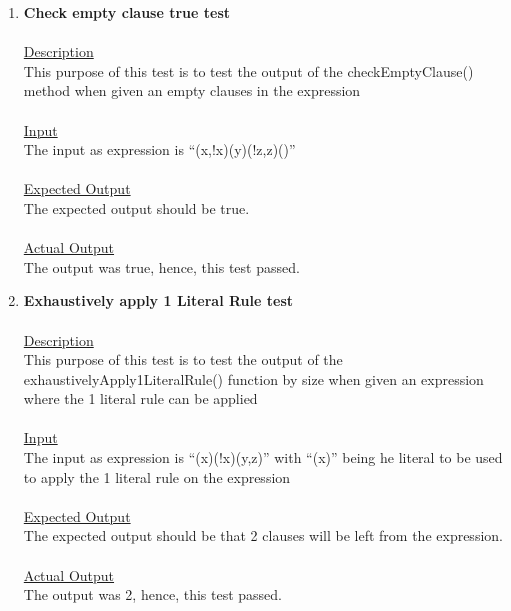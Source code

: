 \documentclass{article}
\newcommand{\quotes}[1]{``#1''}
\begin{document}
\begin{enumerate}
		\item \textbf{Check empty clause true test}\\\\
		\underline{Description}\\
		\indent This purpose of this test is to test the output of the checkEmptyClause() method when given an empty clauses in the expression\\\\
		\underline{Input}\\
		\indent The input as expression is \quotes{(x,!x)(y)(!z,z)()}\\	\\
		\underline{Expected Output}\\
		\indent The expected output should be true.\\\\
		\underline{Actual Output}\\
		\indent The output was true, hence, this test passed.\\
		
		\item \textbf{Exhaustively apply 1 Literal Rule test}\\\\
		\underline{Description}\\
		\indent This purpose of this test is to test the output of the exhaustivelyApply1LiteralRule() function by size  when given an expression where the 1 literal rule can be applied\\\\
		\underline{Input}\\
		\indent The input as expression is \quotes{(x)(!x)(y,z)} with \quotes{(x)} being he literal to be used to apply the 1 literal rule on the expression\\	\\
		\underline{Expected Output}\\
		\indent The expected output should be that 2 clauses will be left from the expression.\\\\
		\underline{Actual Output}\\
		\indent The output was 2, hence, this test passed.\\
		

\end{enumerate}
\end{document}
